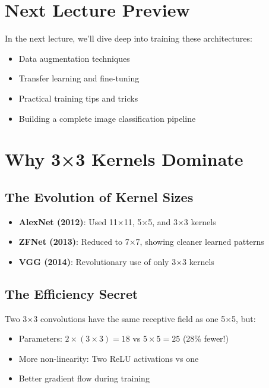 \documentclass{article}
\begin{document}
\section{Next Lecture Preview}

In the next lecture, we'll dive deep into training these architectures:
\begin{itemize}
    \item Data augmentation techniques
    \item Transfer learning and fine-tuning
    \item Practical training tips and tricks
    \item Building a complete image classification pipeline
\end{itemize}



\section{Why 3×3 Kernels Dominate}

\subsection{The Evolution of Kernel Sizes}

\begin{itemize}
    \item \textbf{AlexNet (2012)}: Used 11×11, 5×5, and 3×3 kernels
    \item \textbf{ZFNet (2013)}: Reduced to 7×7, showing cleaner learned patterns
    \item \textbf{VGG (2014)}: Revolutionary use of only 3×3 kernels
\end{itemize}

\subsection{The Efficiency Secret}

Two 3×3 convolutions have the same receptive field as one 5×5, but:
\begin{itemize}
    \item Parameters: $2 \times (3 \times 3) = 18$ vs $5 \times 5 = 25$ (28\% fewer!)
    \item More non-linearity: Two ReLU activations vs one
    \item Better gradient flow during training
\end{itemize}
\end{document}
